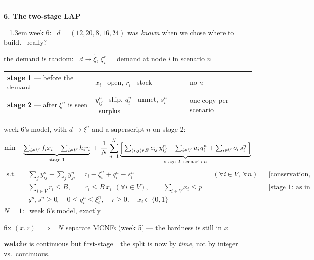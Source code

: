 \documentclass[10pt]{article}
\newcommand{\beat}[2]{%
  \par\medskip\needspace{8\baselineskip}%
  {\color{ruleink}\rule{\textwidth}{1pt}}\par\nobreak\vspace{2pt}
  {\large\bfseries #1.\; #2}\par\nobreak\vspace{3pt}}
\newenvironment{board}{%
  \par\vspace{2pt}
  \begingroup\leftskip=1.3em\relax}{%
  \par\endgroup\vspace{2pt}}
\newcommand{\watch}[1]{\par{\color{watchink}\small\textbf{watch}\quad #1}\par}
\begin{document}
\beat{6}{The two-stage LAP}
\begin{board}
week 6: \ $d = (12, 20, 8, 16, 24)$ was \emph{known} when we chose where to build. \ really?
\vspace{2pt}

the demand is random: \ $d \to \tilde{\xi}$, \quad $\xi^n_i$ = demand at node $i$ in scenario $n$
\begin{center}
\begin{tabular}{@{}l|l|l@{}}
 \textbf{stage 1} --- before the demand & $x_i$ \ open, \quad $r_i$ \ stock & no $n$ \\[3pt]
 \textbf{stage 2} --- after $\xi^n$ is seen & $y^n_{ij}$ \ ship, \quad $q^n_i$ \ unmet, \quad $s^n_i$ \ surplus & one copy per scenario \\
\end{tabular}
\end{center}
week 6's model, with $d \to \xi^n$ and a superscript $n$ on stage 2:
\[
  \min\quad
  \underbrace{\textstyle\sum_{i \in V} f_i x_i + \sum_{i \in V} h_i r_i}_{\text{stage 1}}
  \;+\; \frac{1}{N} \sum_{n=1}^{N}
  \underbrace{\Bigl[\, \textstyle\sum_{(i,j) \in E} c_{ij}\, y^n_{ij} + \sum_{i \in V} u_i\, q^n_i + \sum_{i \in V} o_i\, s^n_i \,\Bigr]}_{\text{stage 2, scenario $n$}}
\]
\vspace{-2pt}
\[
\begin{aligned}
  \text{s.t.}\quad
    & \textstyle\sum_{j} y^n_{ij} - \sum_{j} y^n_{ji} = r_i - \xi^n_i + q^n_i - s^n_i && (\forall i \in V, \ \forall n) && \text{[conservation, per scenario]} \\
    & \textstyle\sum_{i \in V} r_i \le B, \qquad r_i \le B\, x_i \ \ (\forall i \in V), \qquad \sum_{i \in V} x_i \le p && && \text{[stage 1: as in week 6]} \\
    & y^n, s^n \ge 0, \quad 0 \le q^n_i \le \xi^n_i, \quad r \ge 0, \quad x_i \in \{0,1\}
\end{aligned}
\]
$N = 1$: \ week 6's model, exactly
\vspace{2pt}

fix $(x, r)$ \ $\Rightarrow$ \ $N$ separate MCNFs (week 5) --- the hardness is still in $x$
\end{board}
\watch{$r$ is continuous but first-stage: \ the split is now by \emph{time}, not by integer vs.\ continuous.}
\end{document}
